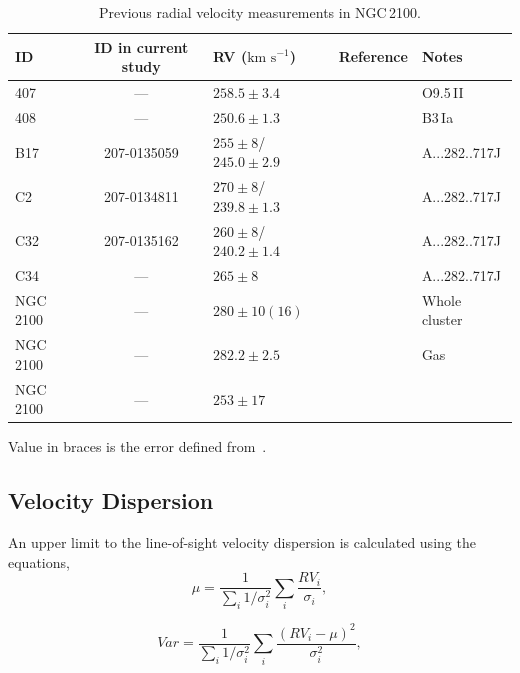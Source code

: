 \documentclass[useAMS,usenatbib]{mn2e}
\def\kms{$\mbox{km s}^{-1}$}
\begin{document}
\begin{table}
\caption{
        Previous radial velocity measurements in NGC\,2100.\label{tb:rvs}
        }
\scriptsize
\begin{center}
\begin{tabular}{lclll}
 \hline
 \hline
ID & ID in current study & RV (\kms) & Reference & Notes \\
 \hline
407 & ---         & $258.5\pm3.4$           & \cite{2015arXiv150803490E} &  O9.5\,II  \\
408 & ---         & $250.6\pm1.3$           & \cite{2015arXiv150803490E} &  B3\,Ia    \\
B17 & 207-0135059 & $255\pm8$/$245.0\pm2.9$ & {\cite{1994A&A...282..717J}} \\
C2  & 207-0134811 & $270\pm8$/$239.8\pm1.3$ & {\cite{1994A&A...282..717J}} & \\
C32 & 207-0135162 & $260\pm8$/$240.2\pm1.4$ & {\cite{1994A&A...282..717J}} & \\
C34 & ---         & $265\pm8$               & {\cite{1994A&A...282..717J}} & \\
NGC\,2100 & ---   & $280\pm10(16)$          & {\cite{1972MNRAS.159..445A}} & Whole cluster\\
NGC\,2100 & --- & $282.2\pm2.5$             & {\cite{1971ApJ...169..271S}} & Gas\\
NGC\,2100 & --- & $253\pm17$                & {\cite{1970PhD...........F}} & \\

\hline
\end{tabular}
\end{center}
{Value in braces is the error defined from~\cite{1983ApJ...272..488F}.}
\end{table}

\subsection{Velocity Dispersion} %
\label{sub:velocity_dispersion}

An upper limit to the line-of-sight velocity dispersion is calculated using the equations,
\begin{equation}
  \mu = \frac{1}{\sum_{i} 1/\sigma_{i}^{2}} \sum_{i} \frac{RV_{i}}{\sigma_{i}},
\end{equation}

\begin{equation}
Var = \frac{1}{\sum_{i}1/\sigma_{i}^{2}} \sum_{i}\frac{(RV_{i} - \mu)^{2}}{\sigma_{i}^{2}},
\end{equation}
\end{document}
